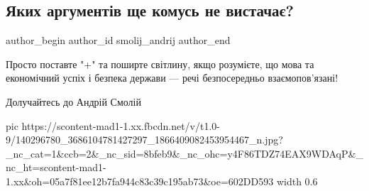  
 
 
 
 
\subsection{Яких аргументів ще комусь не вистачає?}
\ifcmt
  author_begin
   author_id smolij_andrij
  author_end
\fi

Просто поставте "+" та поширте світлину, якщо розумієте, що мова та економічний
успіх і безпека держави — речі безпосередньо взаємопов'язані!

Долучайтесь до Андрій Смолій

\ifcmt
  pic https://scontent-mad1-1.xx.fbcdn.net/v/t1.0-9/140296780_3686104781427297_1866409082453954467_n.jpg?_nc_cat=1&ccb=2&_nc_sid=8bfeb9&_nc_ohc=y4F86TDZ74EAX9WDAqP&_nc_ht=scontent-mad1-1.xx&oh=05a7f81ee12b7fa944c83c39c195ab73&oe=602DD593
  width 0.6
\fi

